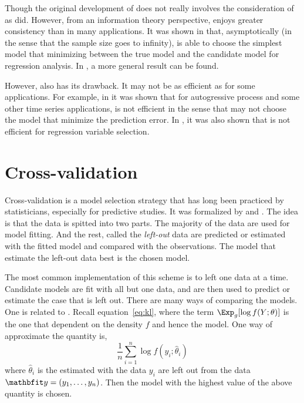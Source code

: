 Though the original development of \bic \cite{Schwarz:1978uv} does not really
involves the consideration of \kl as \aic did. However, from an information
theory perspective, \bic enjoys greater consistency than \aic in many
applications. It was shown in \cite{Yang:2005vj} that, asymptotically (in the
sense that the sample size goes to infinity), \bic is able to choose the
simplest model that minimizing \kl between the true model and the candidate
model for regression analysis. In \cite{Sin:1996vs}, a more general result can
be found.

However, \bic also has its drawback. It may not be as efficient as \aic for
some applications. For example, in \cite{Lee2001} it was shown that for
autogressive process and some other time series applications, \bic is not
efficient in the sense that \bic may not choose the model that minimize the
prediction error. In \cite[][sec.~4.7]{Claeskens:2008tq}, it was also shown
that \bic is not efficient for regression variable selection.


\section{Cross-validation}
\label{sec:Cross-validation}

Cross-validation is a model selection strategy that has long been practiced by
statisticians, especially for predictive studies. It was formalized by
\cite{Stone1974} and \cite{Geisser1975}. The idea is that the data is spitted
into two parts. The majority of the data are used for model fitting. And the
rest, called the \emph{left-out} data are predicted or estimated with
the fitted model and compared with the observations. The model that estimate
the left-out data best is the chosen model.

The most common implementation of this scheme is to left one data at a time.
Candidate models are fit with all but one data, and are then used to predict
or estimate the case that is left out. There are many ways of comparing the
models. One is related to \kl. Recall equation~\eqref{eq:kl}, where the term
$\Exp_g[\log f(Y;\theta)]$ is the one that dependent on the density $f$ and
hence the model. One way of approximate the quantity is,
\begin{equation}
  \frac{1}{n}\sum_{i=1}^n \log f(y_i;\hat\theta_i)
\end{equation}
where $\hat\theta_i$ is the \mle estimated with the data $y_i$ are left out
from the data $\data = (y_1,\dots,y_n)$. Then the model with the highest
value of the above quantity is chosen.

